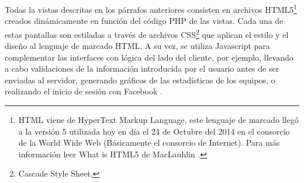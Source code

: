 		Todas la vistas descritas en los párrafos anteriores consisten en archivos HTML5\footnote{HTML viene de HyperText Markup Language, este lenguaje de marcado llegó a la versión 5 utilizada hoy en día el 24 de Octubre del 2014 en el consorcio de la World Wide Web (Básicamente el consorcio de Internet). Para más información leer What is HTML5 de MacLauhlin \cite{mclaughlin2011html5}.} creados dinámicamente en función del código PHP de las vistas. Cada una de estas pantallas son estiladas a través de archivos CSS\footnote{Cascade Style Sheet, } que aplican el estilo y el diseño al lenguaje de marcado HTML. A su vez, se utiliza Javascript para complementar las interfaces con lógica del lado del cliente, por ejemplo, llevando a cabo validaciones de la información introducida por el usuario antes de ser enviadas al servidor, generando gráficos de las estadísticas de los equipos, o realizando el inicio de sesión con Facebook \cite{facebookDocuWeb}.

